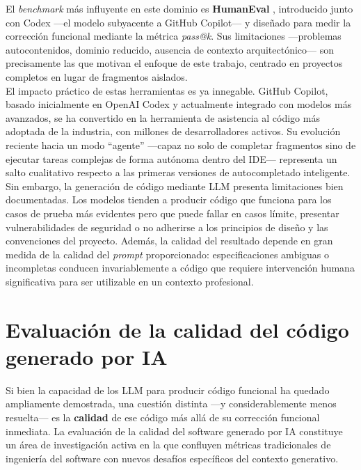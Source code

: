 El \textit{benchmark} más influyente en este dominio es \textbf{HumanEval} \cite{Chen:2021:Codex}, introducido junto con Codex ---el modelo subyacente a GitHub Copilot--- y diseñado para medir la corrección funcional mediante la métrica \textit{pass@k}. Sus limitaciones ---problemas autocontenidos, dominio reducido, ausencia de contexto arquitectónico--- son precisamente las que motivan el enfoque de este trabajo, centrado en proyectos completos en lugar de fragmentos aislados.\\

El impacto práctico de estas herramientas es ya innegable. GitHub Copilot, basado inicialmente en OpenAI Codex y actualmente integrado con modelos más avanzados, se ha convertido en la herramienta de asistencia al código más adoptada de la industria, con millones de desarrolladores activos. Su evolución reciente hacia un modo ``agente'' ---capaz no solo de completar fragmentos sino de ejecutar tareas complejas de forma autónoma dentro del IDE--- representa un salto cualitativo respecto a las primeras versiones de autocompletado inteligente.\\

Sin embargo, la generación de código mediante \ac{LLM} presenta limitaciones bien documentadas. Los modelos tienden a producir código que funciona para los casos de prueba más evidentes pero que puede fallar en casos límite, presentar vulnerabilidades de seguridad o no adherirse a los principios de diseño y las convenciones del proyecto. Además, la calidad del resultado depende en gran medida de la calidad del \textit{prompt} proporcionado: especificaciones ambiguas o incompletas conducen invariablemente a código que requiere intervención humana significativa para ser utilizable en un contexto profesional.\\

\section{Evaluación de la calidad del código generado por IA} \label{sec:evaluacion-calidad}

Si bien la capacidad de los \ac{LLM} para producir código funcional ha quedado ampliamente demostrada, una cuestión distinta ---y considerablemente menos resuelta--- es la \textbf{calidad} de ese código más allá de su corrección funcional inmediata. La evaluación de la calidad del software generado por \ac{IA} constituye un área de investigación activa en la que confluyen métricas tradicionales de ingeniería del software con nuevos desafíos específicos del contexto generativo.\\

